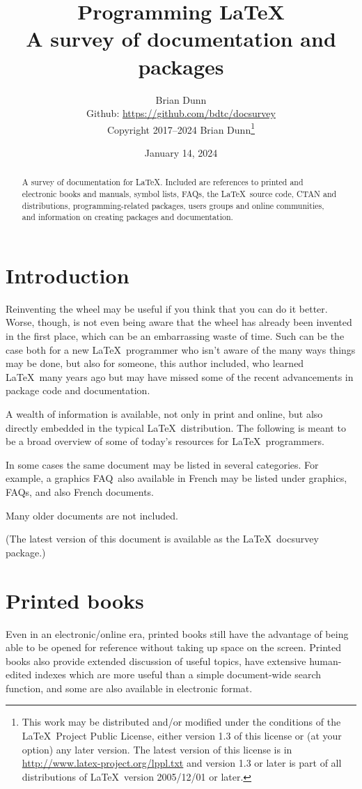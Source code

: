 \documentclass{article}
\title{Programming \LaTeX\Dash \\ A survey of documentation and packages}
\author{Brian Dunn \\
	\small Github: \url{https://github.com/bdtc/docsurvey} \\
	\small Copyright 2017--2024 Brian Dunn\thanks{
		This work may be distributed and/or modified under the
		conditions of the \LaTeX\ Project Public License, either version 1.3
		of this license or (at your option) any later version.
		The latest version of this license is in
		\url{http://www.latex-project.org/lppl.txt}
		and version 1.3 or later is part of all distributions of \LaTeX\
		version 2005/12/01 or later.
	}
}
\date{January 14, 2024}
\def\FAQ{\acro{FAQ}}
\newcommand{\acro}[1]{\textsc{\MakeLowercase{#1}}}
\def\pkg#1{#1}%
\def\LaTeX{LaTeX}%
\def\acro#1{#1}%
\renewcommand*{\pkg}[1]{#1}
\renewcommand*{\LaTeX}{LaTeX}
\begin{document}
\maketitle


\thispagestyle{empty}

\begin{abstract}
\noindent
A survey of documentation for \LaTeX.
Included are references to printed and electronic books and manuals,
symbol lists, \FAQ{}s, the \LaTeX\ source code, CTAN and distributions,
programming-related packages, users groups and online communities,
and information on creating packages and documentation.
\end{abstract}


\tableofcontents


\section{Introduction}

Reinventing the wheel may be useful if you think that you can do it better.
Worse, though, is not even being aware that the wheel has already been
invented in the first place, which can be an embarrassing waste of time.
Such can be the case both for a new \LaTeX\ programmer who isn't aware of
the many ways things may be done, but also for someone, this author included,
who learned \LaTeX\ many years ago but may have missed some of the recent
advancements in package code and documentation.

A wealth of information is available, not only in print and online,
but also directly embedded in the typical \LaTeX\ distribution.
The following is meant to be a broad overview of some of today's resources
for \LaTeX\ programmers.

In some cases the same document may be listed in several categories.
For example, a graphics \FAQ\ also available in French may be listed under
graphics, \FAQ{}s, and also French documents.

Many older documents are not included.

(The latest version of this document is available as the \LaTeX\ \pkg{docsurvey} package.)


\section{Printed books}

Even in an electronic/online era, printed books still have the advantage
of being able to be opened for reference without taking up space
on the screen.  Printed books also provide extended discussion of
useful topics, have extensive human-edited indexes which are more useful
than a simple document-wide search function, and some are also available in
electronic format.
\end{document}
